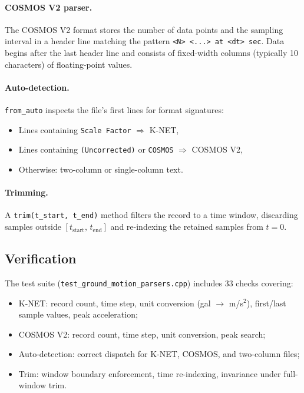 \paragraph{COSMOS V2 parser.}
The COSMOS V2 format stores the number of data points and the sampling
interval in a header line matching the pattern
\verb|<N> <...> at <dt> sec|.  Data begins after the last header line and
consists of fixed-width columns (typically 10 characters) of floating-point
values.

\paragraph{Auto-detection.}
\texttt{from\_auto} inspects the file's first lines for format signatures:
\begin{itemize}
  \item Lines containing \texttt{Scale Factor} $\Rightarrow$ K-NET,
  \item Lines containing \texttt{(Uncorrected)} or \texttt{COSMOS} $\Rightarrow$ COSMOS V2,
  \item Otherwise: two-column or single-column text.
\end{itemize}

\paragraph{Trimming.}
A \texttt{trim(t\_start, t\_end)} method filters the record to a time
window, discarding samples outside $[t_{\text{start}},\, t_{\text{end}}]$
and re-indexing the retained samples from $t=0$.

\subsection{Verification}

The test suite (\texttt{test\_ground\_motion\_parsers.cpp}) includes 33
checks covering:
\begin{itemize}
  \item K-NET: record count, time step, unit conversion (gal $\to$ m/s$^2$),
        first/last sample values, peak acceleration;
  \item COSMOS V2: record count, time step, unit conversion, peak search;
  \item Auto-detection: correct dispatch for K-NET, COSMOS, and two-column
        files;
  \item Trim: window boundary enforcement, time re-indexing, invariance
        under full-window trim.
\end{itemize}


